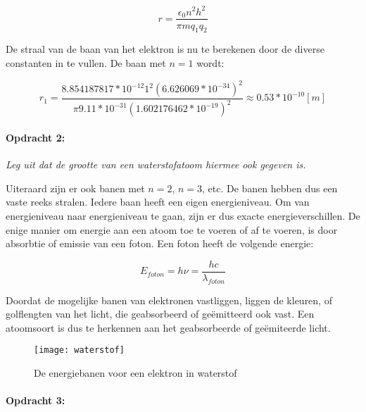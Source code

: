\begin{equation} \label{eq:db7}
r=\frac{\epsilon_{0}n^{2}h^{2}}{\pi mq_{1}q_{2}}
\end{equation}


De straal van de baan van het elektron is nu te berekenen door de
diverse constanten in te vullen. De baan met $n=1$ wordt:

\begin{equation}
r_{1}=\frac{8.854187817*10^{-12}1^{2}\left(6.626069*10^{-34}\right)^{2}}
{\pi9.11*10^{-31}\left(1.602176462*10^{-19}\right)^{2}}\approx0.53*10^{-10}[m]
\end{equation}



\paragraph*{Opdracht 2:}

\emph{Leg uit dat de grootte van een waterstofatoom hiermee ook gegeven
is.}

Uiteraard zijn er ook banen met $n=2$, $n=3$, etc. De banen hebben
dus een vaste reeks stralen. Iedere baan heeft een eigen energieniveau.
Om van energieniveau naar energieniveau te gaan, zijn er dus exacte
energieverschillen. De enige manier om energie aan een atoom toe te
voeren of af te voeren, is door absorbtie of emissie van een foton.
Een foton heeft de volgende energie:

\begin{equation}
E_{foton}=h\nu=\frac{hc}{\lambda_{foton}}
\end{equation}


Doordat de mogelijke banen van elektronen vastliggen, liggen de kleuren,
of golflengten van het licht, die geabsorbeerd of geëmitteerd ook
vast. Een atoomsoort is dus te herkennen aan het geabsorbeerde of
geëmiteerde licht.

\begin{figure}[H]
\noindent \begin{centering}
\texttt{[image: waterstof]}
\par\end{centering}

\caption{De energiebanen voor een elektron in waterstof}
\end{figure}



\paragraph*{Opdracht 3:}

